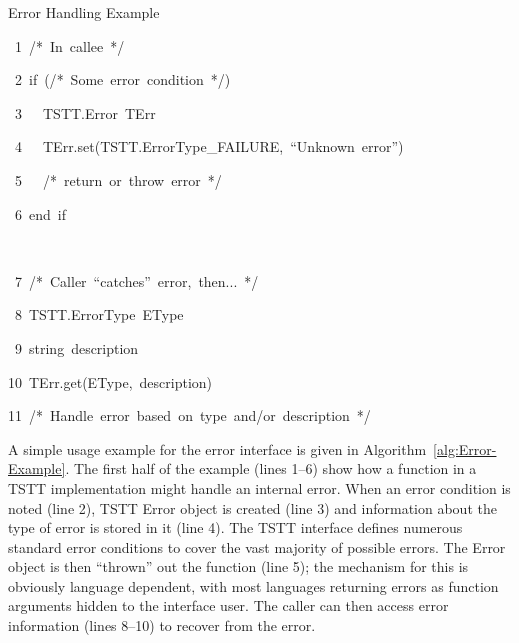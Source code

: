 %
\begin{algorithm}

\caption{Error Handling Example}\label{alg:Error-Example}

\begin{lyxcode}
~1~/{*}~In~callee~{*}/

~2~if~(/{*}~Some~error~condition~{*}/)

~3~~~TSTT.Error~TErr

~4~~~TErr.set(TSTT.ErrorType\_FAILURE,~{}``Unknown~error'')

~5~~~/{*}~return~or~throw~error~{*}/

~6~end~if

~

~7~/{*}~Caller~{}``catches''~error,~then...~{*}/

~8~TSTT.ErrorType~EType

~9~string~description

10~TErr.get(EType,~description)

11~/{*}~Handle~error~based~on~type~and/or~description~{*}/
\end{lyxcode}

\end{algorithm}

A simple usage example for the error interface is given in 
Algorithm~\ref{alg:Error-Example}.  The first half of the example (lines
1--6) show how a function in a TSTT implementation might handle an
internal error.  When an error condition is noted (line 2), TSTT Error
object is created (line 3) and information about the type of error is
stored in it (line 4).  The TSTT interface defines numerous standard
error conditions to cover the vast majority of possible errors.  The
Error object is then ``thrown'' out the function (line 5); the mechanism
for this is obviously language dependent, with most languages returning
errors as function arguments hidden to the interface user.  The caller
can then access error information (lines 8--10) to
recover from the error.

